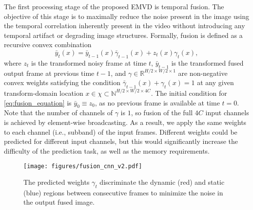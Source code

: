 \documentclass[final]{cvpr}
\begin{document}
    The first processing stage of the proposed EMVD is temporal fusion. The objective of this stage is to maximally reduce the noise present in the image using the temporal correlation inherently present in the video without introducing any temporal artifact or degrading image structures. Formally, fusion is defined as a recursive convex combination
    \begin{equation}
        \bar{y}_t(x) = \bar{y}_{t-1}(x) \bar{\gamma}_{t-1}(x) + z_t(x) \gamma_t(x),
        \label{eq:fusion_equation}
    \end{equation}
    where $z_t$ is the transformed noisy frame at time $t$, $\bar{y}_{t-1}$ is the transformed fused output frame at previous time $t-1$, and $\gamma \in \mathbb{R}^{H/2 \times W/2 \times 1}$ are non-negative convex weights satisfying the condition $\bar{\gamma}_{t-1}(x) + \gamma_t(x) = 1$ at any given transform-domain location $x \in \chi \subset \mathbb{N}^{H/2 \times W/2 \times 4C}$. The initial condition for \eqref{eq:fusion_equation} is $\bar{y}_{0} \equiv z_0$, as no previous frame is available at time $t = 0$. Note that the number of channels of $\gamma$ is $1$, so fusion of the full $4C$ input channels is achieved by element-wise broadcasting. As a result, we apply the same weights to each channel (i.e., subband) of the input frames. Different weights could be predicted for different input channels, but this would significantly increase the difficulty of the prediction task, as well as the memory requirements. 

    \begin{figure}[t]
        \centering
        \texttt{[image: figures/fusion\_cnn\_v2.pdf]}
        \caption{The predicted weights $\gamma_t$ discriminate the dynamic (red) and static (blue) regions between consecutive frames to minimize the noise in the output fused image.}
        \label{fig:fusion} 
    \end{figure}
    
\end{document}
